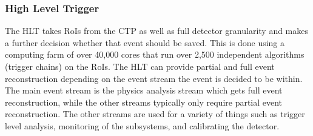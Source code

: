 \subsubsection{High Level Trigger}
The HLT takes RoIs from the CTP as well as full detector granularity and makes a further decision whether that event should be saved.  This is done using a computing farm of over 40,000 cores that run over 2,500 independent algorithms (trigger chains) on the RoIs.  The HLT can provide partial and full event reconstruction depending on the event stream the event is decided to be within.  The main event stream is the physics analysis stream which gets full event reconstruction, while the other streams typically only require partial event reconstruction.  The other streams are used for a variety of things such as trigger level analysis, monitoring of the subsystems, and calibrating the detector.














